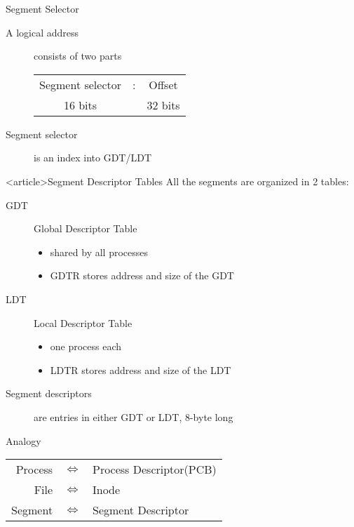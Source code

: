 \begin{frame}
  \begin{center}
  \end{center}
\end{frame}

\begin{frame}{Segment Selector}
  \begin{description}
  \item[A logical address] consists of two parts\par
      \begin{tabular}{@{}c@{\,}c@{\,}c@{}}
        {\Large Segment selector}&{\Large:}&{\Large Offset}\\\cline{1-1}\cline{3-3}
        16 bits&&32 bits
      \end{tabular}
  \item[Segment selector] is an index into GDT/LDT
  \end{description}
    \begin{center}
    \end{center}
\end{frame}

\begin{frame}<article>{Segment Descriptor Tables}
    All the segments are organized in 2 tables:
    \begin{description}
    \item[GDT] \alert{Global Descriptor Table}
      \begin{itemize}
      \item shared by all processes
      \item GDTR stores address and size of the GDT
      \end{itemize}
    \item[LDT] \alert{Local Descriptor Table}
      \begin{itemize}
      \item one process each
      \item LDTR stores address and size of the LDT
      \end{itemize}
    \item[Segment descriptors] are entries in either GDT or LDT, 8-byte long
    \end{description}
      \begin{iblock}{Analogy}
        \begin{center}
          \begin{tabular}{rcl}
            Process&$\Longleftrightarrow$&Process Descriptor(PCB)\\
            File&$\Longleftrightarrow$&Inode\\
            Segment&$\Longleftrightarrow$&Segment Descriptor
          \end{tabular}
        \end{center}
      \end{iblock}
\end{frame}

